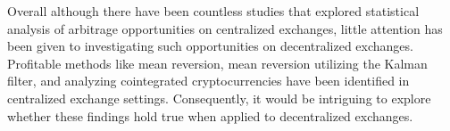 \noindent Overall although there have been countless studies that explored statistical analysis of arbitrage opportunities on centralized exchanges, little attention has been given to investigating such opportunities on decentralized exchanges. Profitable methods like mean reversion, mean reversion utilizing the Kalman filter, and analyzing cointegrated cryptocurrencies have been identified in centralized exchange settings. Consequently, it would be intriguing to explore whether these findings hold true when applied to decentralized exchanges.
